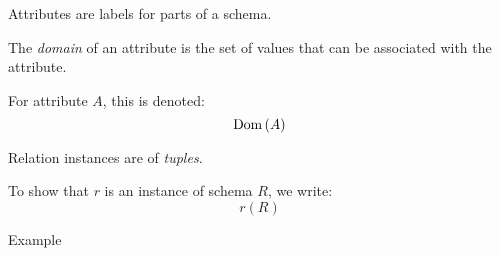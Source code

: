 \begin{multicols}{2}
\begin{CheatsheetEntryFrame}
    \end{CheatsheetEntryFrame}

    \begin{CheatsheetEntryFrame}


        Attributes are labels for parts of a schema.

        The \textit{domain} of an attribute is the set of values that can be associated with the attribute.

        For attribute $A$, this is denoted:
        \begin{equation*}
            \operatorname{Dom}{(A)}
        \end{equation*}

    \end{CheatsheetEntryFrame}


    \MulticolsBreak

    \begin{CheatsheetEntryFrame}


        Relation instances are  of \textit{tuples}.

        To show that $r$ is an instance of schema $R$, we write:
        \begin{equation*}
            r(R)
        \end{equation*}


        \SubsectionFrameRemoveSeparation
        \begin{RelAlgSubsection}{Example}
        \begin{center}
            \newcommand{\Y}{0.44}
            \newcommand{\Yhalf}{0.22}
            \newcommand{\MyTableCell}[3]{%
                (R#1 -| C#2) node[right, align=left, font=\footnotesize] {\vphantom{$M_I^{I^x}$}\texttt{#3}}%
            }
\end{center}
\end{RelAlgSubsection}
\end{CheatsheetEntryFrame}
\end{multicols}
